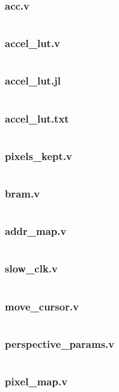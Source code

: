 \documentclass{article}
\begin{document}
\subsubsection{acc.v}
\inputminted[linenos]{verilog}{../../src/acc.v}
\subsubsection{accel\_lut.v}
\inputminted[linenos]{verilog}{../../src/accel_lut.v}
\subsubsection{accel\_lut.jl}
\inputminted[linenos]{julia}{../../src/accel_lut.jl}
\subsubsection{accel\_lut.txt}
\inputminted[linenos]{todotxt}{../../src/accel_lut.txt}
\subsubsection{pixels\_kept.v}
\inputminted[linenos]{verilog}{../../src/pixels_kept.v}
\subsubsection{bram.v}
\inputminted[linenos]{verilog}{../../src/bram.v}
\subsubsection{addr\_map.v}
\inputminted[linenos]{verilog}{../../src/addr_map.v}
\subsubsection{slow\_clk.v}
\inputminted[linenos]{verilog}{../../src/slow_clk.v}
\subsubsection{move\_cursor.v}
\inputminted[linenos]{verilog}{../../src/move_cursor.v}
\subsubsection{perspective\_params.v}
\inputminted[linenos]{verilog}{../../src/perspective_params.v}
\subsubsection{pixel\_map.v}
\inputminted[linenos]{verilog}{../../src/pixel_map.v}
\end{document}

